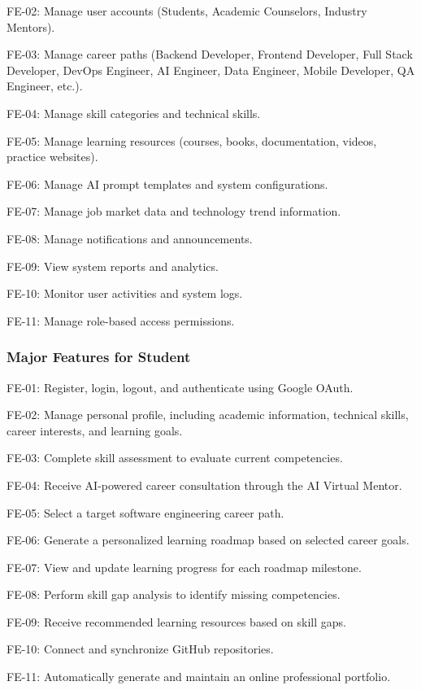 FE-02: Manage user accounts (Students, Academic Counselors, Industry Mentors). 

FE-03: Manage career paths (Backend Developer, Frontend Developer, Full Stack Developer, DevOps Engineer, AI Engineer, Data Engineer, Mobile Developer, QA Engineer, etc.). 

FE-04: Manage skill categories and technical skills. 

FE-05: Manage learning resources (courses, books, documentation, videos, practice websites). 

FE-06: Manage AI prompt templates and system configurations. 

FE-07: Manage job market data and technology trend information. 

FE-08: Manage notifications and announcements. 

FE-09: View system reports and analytics. 

FE-10: Monitor user activities and system logs. 

FE-11: Manage role-based access permissions. 

\subsubsection{Major Features for Student}

FE-01: Register, login, logout, and authenticate using Google OAuth. 

FE-02: Manage personal profile, including academic information, technical skills, career interests, and learning goals. 

FE-03: Complete skill assessment to evaluate current competencies. 

FE-04: Receive AI-powered career consultation through the AI Virtual Mentor. 

FE-05: Select a target software engineering career path. 

FE-06: Generate a personalized learning roadmap based on selected career goals. 

FE-07: View and update learning progress for each roadmap milestone. 

FE-08: Perform skill gap analysis to identify missing competencies. 

FE-09: Receive recommended learning resources based on skill gaps. 

FE-10: Connect and synchronize GitHub repositories. 

FE-11: Automatically generate and maintain an online professional portfolio. 


